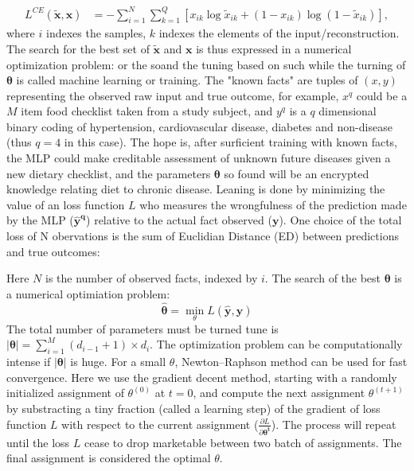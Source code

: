 \begin{equation} \label{eq:CE}
\begin{split}
  L^{CE}(\boldsymbol{\tilde{x}},\boldsymbol{x}) &= -\sum_{i=1}^N\sum_{k=1}^Q[x_{ik}\log{\tilde{x}_{ik}}+(1-x_{ik})\log(1-\tilde{x}_{ik})],
\end{split}
\end{equation}
where $i$ indexes the samples, $k$ indexes the elements of the input/reconstruction. The search for the best set of $\boldsymbol{\tilde{x}}$ and $\boldsymbol{x}$ is thus expressed in a numerical optimization problem:
or the soand the tuning based on such while the turning of $\boldsymbol{\theta}$ is called machine learning or training. The "known facts" are tuples of $(x, y)$ representing the observed raw input and true outcome, for example, $x^q$ could be a $M$ item food checklist taken from a study subject, and $y^q$ is a $q$ dimensional binary coding of hypertension, cardiovascular disease, diabetes and non-disease (thus $q=4$ in this case). The hope is, after surficient training with known facts, the MLP could make creditable assessment of unknown future diseases given a new dietary checklist, and the parameters $\boldsymbol{\theta}$ so found will be an encrypted knowledge relating diet to chronic disease. Leaning is done by minimizing the value of an loss function $L$ who measures the wrongfulness of the prediction made by the MLP ($\boldsymbol{\hat{y}^q}$) relative to the actual fact observed ($\boldsymbol{y}$). 
One choice of the total loss of N obervations is the sum of Euclidian Distance (ED) between predictions and true outcomes:

Here $N$ is the number of observed facts, indexed by $i$. The search of the best $\boldsymbol{\theta}$ is a numerical optimiation problem:
\[\boldsymbol{\hat{\theta}}=\min_{\theta}L(\boldsymbol{\hat{y}},\boldsymbol{y})\]
The total number of parameters must be turned tune is $|\boldsymbol{\theta}|=\sum_{i=1}^{M}{(d_{i-1}+1) \times d_i}$. The optimization problem can be computationally intense if $|\boldsymbol{\theta}|$ is huge. For a small $\theta$, Newton–Raphson method can be used for fast convergence. Here we use the gradient decent method, starting with a randomly initialized assignment of $\theta^(0)$ at $t=0$, and compute the next assignment $\theta^{(t+1)}$ by substracting a tiny fraction (called a learning step) of the gradient of loss function $L$ with respect to the current assignment ($\frac{\partial L}{\partial \boldsymbol{\theta^{t}}}$). The process will repeat until the loss $L$ cease to drop marketable between two batch of assignments. The final assignment is considered the optimal $\theta$.

